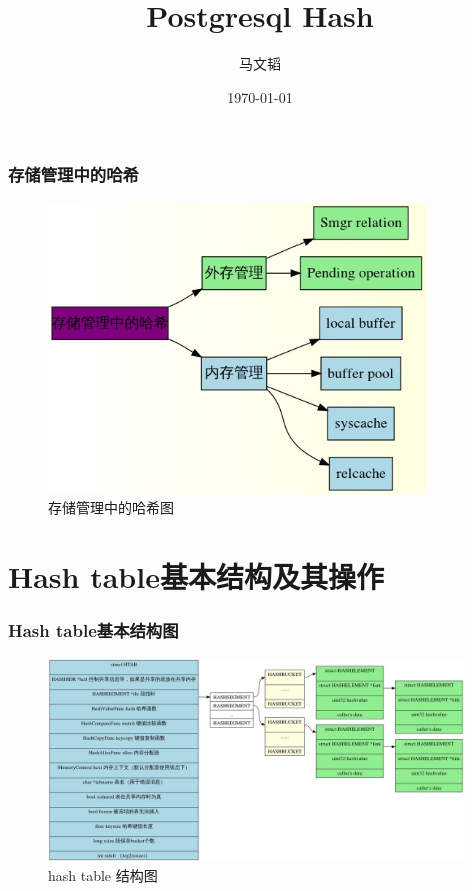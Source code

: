 \documentclass{beamer}
\begin{document}
\begin{CJK*}{UTF8}{gkai}
\title{Postgresql Hash} 
\author{马文韬}
\date{\today} 

\frame{\titlepage} 
\frame{\tableofcontents}


\begin{frame}
\transdissolve
\frametitle{存储管理中的哈希}

\begin{figure}[!ht]
\centering
\includegraphics[width = 100mm]{index.jpg}
\caption{存储管理中的哈希图}
\label{overflow}
\end{figure}
\end{frame}

\section{Hash table基本结构及其操作} 
\begin{frame}
\transdissolve
\frametitle{Hash table基本结构图}

\begin{figure}[!ht]
\centering
\includegraphics[width = 110mm]{hash.jpg}
\caption{hash table 结构图}
\label{overflow}
\end{figure}
\end{frame}


\end{CJK*}
\end{document}
